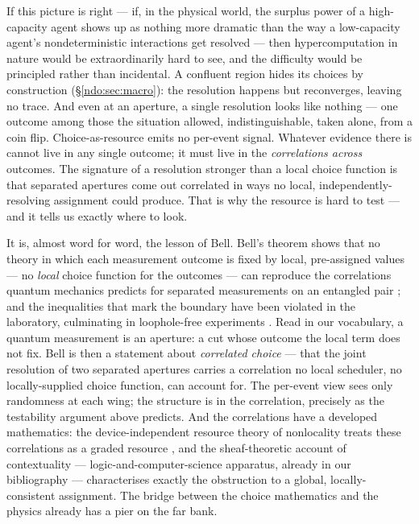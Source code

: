 If this picture is right --- if, in the physical world, the surplus power of a high-capacity
agent shows up as nothing more dramatic than the way a low-capacity agent's nondeterministic
interactions get resolved --- then hypercomputation in nature would be extraordinarily hard to
see, and the difficulty would be principled rather than incidental. A confluent region hides
its choices by construction (\S\ref{ndo:sec:macro}): the resolution happens but reconverges,
leaving no trace. And even at an aperture, a single resolution looks like nothing --- one
outcome among those the situation allowed, indistinguishable, taken alone, from a coin flip.
Choice-as-resource emits no per-event signal. Whatever evidence there is cannot live in any
single outcome; it must live in the \emph{correlations across} outcomes. The signature of a
resolution stronger than a local choice function is that separated apertures come out
correlated in ways no local, independently-resolving assignment could produce. That is why the
resource is hard to test --- and it tells us exactly where to look.

It is, almost word for word, the lesson of Bell. Bell's theorem shows that no theory in which
each measurement outcome is fixed by local, pre-assigned values --- no \emph{local} choice
function for the outcomes --- can reproduce the correlations quantum mechanics predicts for
separated measurements on an entangled pair \cite{bell}; and the inequalities that mark the
boundary have been violated in the laboratory, culminating in loophole-free experiments
\cite{hensen}. Read in our vocabulary, a quantum measurement is an aperture: a cut whose
outcome the local term does not fix. Bell is then a statement about \emph{correlated choice} ---
that the joint resolution of two separated apertures carries a correlation no local scheduler,
no locally-supplied choice function, can account for. The per-event view sees only randomness
at each wing; the structure is in the correlation, precisely as the testability argument above
predicts. And the correlations have a developed mathematics: the device-independent resource
theory of nonlocality treats these correlations as a graded resource \cite{brunner}, and the
sheaf-theoretic account of contextuality \cite{abramsky} --- logic-and-computer-science
apparatus, already in our bibliography --- characterises exactly the obstruction to a global,
locally-consistent assignment. The bridge between the choice mathematics and the physics already
has a pier on the far bank.

